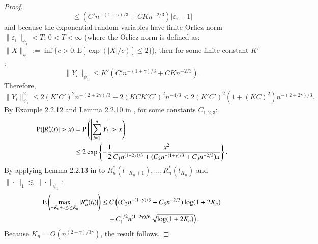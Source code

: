 \begin{proof}
\[ \le (C' n^{-(1+\gamma)/3} + C K n^{-2/3}) |\varepsilon_i-1| \]
and because the exponential random variables
have finite Orlicz norm $\|\varepsilon_i\|_{\psi_1} < T$, $0 < T < \infty$ (where the Orlicz norm is defined as: $\|X\|_{\psi_1}
:= \inf \{ c > 0 : \mathrm{E} [ \exp ( |X| / c ) ] \le 2 \}$),
then for some finite constant $K'$:
\[ \|Y_i\|_{\psi_1} \le K' (C' n^{-(1+\gamma)/3} + C K n^{-2/3}). \]
Therefore,
\[ \|Y_i\|_{\psi_1}^2 \le 2(K'C')^2 n^{-(2+2\gamma)/3} + 2(KCK'C')^2 n^{-4/3} \le 2(K'C')^2 (1+(KC)^2) n^{-(2+2\gamma)/3}. \]
By Example 2.2.12 and Lemma 2.2.10 in \cite{5}, for some constants $C_{1,2,3}$:
\begin{align*}
\mathrm{P} (|R_n^*(t)| > x) &= \mathrm{P} \left(\left|\sum_{i=1}^n Y_i\right| > x\right) \\
&\le 2 \exp\left\{-\frac{1}{2} \frac{x^2}{C_1 n^{(1-2\gamma)/3} + (C_2 n^{-(1+\gamma)/3} + C_3 n^{-2/3}) x}\right\}.
\end{align*}
By applying Lemma 2.2.13 in \cite{5} to $R_n^*(t_{-K_n+1}), \dots, R_n^*(t_{K_n})$
and $\|\cdot\|_1 \lesssim \|\cdot\|_{\psi_1}$:
\begin{align}
\mathrm{E} \left(\max_{-K_n+1 \le i \le K_n} |R_n^*(t_i)| \right) &\lesssim C \left( (C_2 n^{-(1+\gamma)/3} + C_3 n^{-2/3}) \log(1+2K_n) \right. \\
& \quad \left. + \,  C_1^{1/2} n^{(1-2\gamma)/6} \sqrt{\log(1+2K_n)} \right). 
\end{align}
Because $K_n = O(n^{(2-\gamma)/3\gamma})$, the result follows.
\end{proof}

